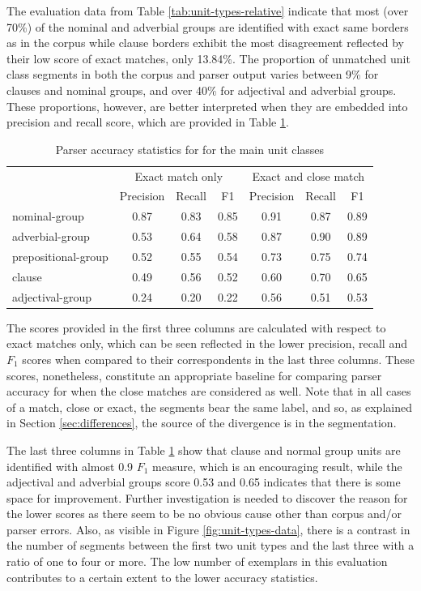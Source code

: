     The evaluation data from Table \ref{tab:unit-types-relative} indicate that most (over 70\%) of the nominal and adverbial groups are identified with exact same borders as in the corpus while clause borders exhibit the most disagreement reflected by their low score of exact matches, only 13.84\%. The proportion of unmatched unit class segments in both the corpus and parser output varies between 9\% for clauses and nominal groups, and over 40\% for adjectival and adverbial groups. These proportions, however, are better interpreted when they are embedded into precision and recall score, which are provided in Table  \ref{tab:unit-types-combined-F1}. 
    \begin{table}[!ht]
    \centering
    \begin{tabular}{lcccccc}
    \toprule
     & \multicolumn{3}{c}{Exact match only} & \multicolumn{3}{c}{Exact and close match} \\ \cline{2-7} 
     & Precision & Recall & F1 & Precision & Recall & F1 \\ 
    \midrule
    nominal-group & 0.87 & 0.83 & 0.85 & 0.91 & 0.87 & 0.89 \\
    adverbial-group & 0.53 & 0.64 & 0.58 & 0.87 & 0.90 & 0.89 \\
    prepositional-group & 0.52 & 0.55 & 0.54 & 0.73 & 0.75 & 0.74 \\
    clause & 0.49 & 0.56 & 0.52 & 0.60 & 0.70 & 0.65 \\
    adjectival-group & 0.24 & 0.20 & 0.22 & 0.56 & 0.51 & 0.53 \\ 
    \bottomrule
    \end{tabular}
    \caption{Parser accuracy statistics for for the main unit classes}
    \label{tab:unit-types-combined-F1}
    \end{table}
    
    The scores provided in the first three columns are calculated with respect to exact matches only, which can be seen reflected in the lower precision, recall and $F_1$ scores when compared to their correspondents in the last three columns. These scores, nonetheless, constitute an appropriate baseline for comparing parser accuracy for when the close matches are considered as well. Note that in all cases of a match, close or exact, the segments bear the same label, and so, as explained in Section \ref{sec:differences}, the source of the divergence is in the segmentation. 
    
    The last three columns in Table \ref{tab:unit-types-combined-F1} show that clause and normal group units are identified with almost 0.9 $F_1$ measure, which is an encouraging result, while the adjectival and adverbial groups score 0.53 and 0.65 indicates that there is some space for improvement. 
    Further investigation is needed to discover the reason for the lower scores as there seem to be no obvious cause other than corpus and/or parser errors. Also, as visible in Figure \ref{fig:unit-types-data}, there is a contrast in the number of segments between the first two unit types and the last three with a ratio of one to four or more. The low number of exemplars in this evaluation contributes to a certain extent to the lower accuracy statistics.
    
